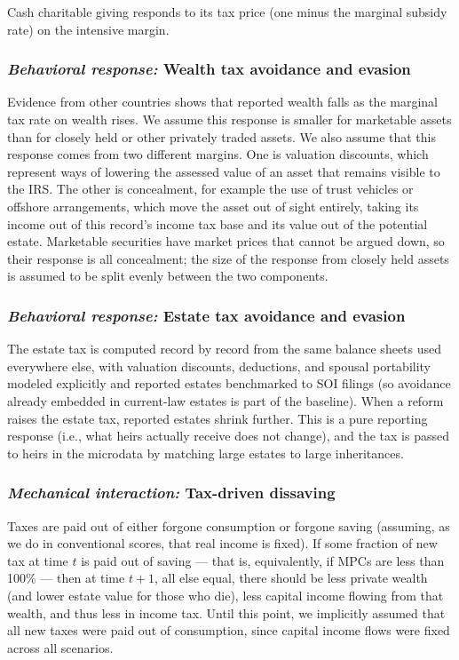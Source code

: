 \documentclass[10pt,twocolumn]{article}
\begin{document}
Cash charitable giving responds to its tax price (one minus the marginal
subsidy rate) on the intensive margin.

\subsubsection*{\textit{Behavioral response:} Wealth tax avoidance and evasion}

Evidence from other countries shows that reported wealth falls as the marginal
tax rate on wealth rises. We assume this response is smaller for marketable
assets than for closely held or other privately traded assets. We also assume
that this response comes from two different margins. One is valuation
discounts, which represent ways of lowering the assessed value of an asset
that remains visible to the IRS. The other is concealment, for example the use
of trust vehicles or offshore arrangements, which move the asset out of sight
entirely, taking its income out of this record's income tax base and its value
out of the potential estate. Marketable securities have market prices that
cannot be argued down, so their response is all concealment; the size of the
response from closely held assets is assumed to be split evenly between the
two components.

\subsubsection*{\textit{Behavioral response:} Estate tax avoidance and evasion}

The estate tax is computed record by record from the same balance sheets used
everywhere else, with valuation discounts, deductions, and spousal portability
modeled explicitly and reported estates benchmarked to SOI filings (so
avoidance already embedded in current-law estates is part of the baseline).
When a reform raises the estate tax, reported estates shrink further. This is
a pure reporting response (i.e., what heirs actually receive does not change),
and the tax is passed to heirs in the microdata by matching large estates to
large inheritances.

\subsubsection*{\textit{Mechanical interaction:} Tax-driven dissaving}

Taxes are paid out of either forgone consumption or forgone saving (assuming,
as we do in conventional scores, that real income is fixed). If some fraction
of new tax at time $t$ is paid out of saving --- that is, equivalently, if
MPCs are less than 100\% --- then at time $t{+}1$, all else equal, there
should be less private wealth (and lower estate value for those who die), less
capital income flowing from that wealth, and thus less in income tax. Until
this point, we implicitly assumed that all new taxes were paid out of
consumption, since capital income flows were fixed across all scenarios.
\end{document}
